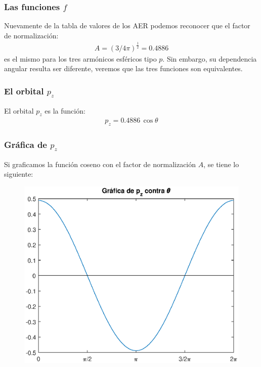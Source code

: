 \documentclass[12pt]{beamer}
\begin{document}

\begin{frame}
\frametitle{Las funciones $f$}
Nuevamente de la tabla de valores de los AER podemos reconocer que el factor de normalización:
\pause
\begin{align*}
A = (3/4 \pi)^{\frac{1}{2}} = 0.4886
\end{align*}
es el mismo para los tres armónicos esféricos tipo $p$. \pause Sin embargo, su dependencia angular resulta ser diferente, veremos que las tres funciones son equivalentes.
\end{frame}
\begin{frame}
\frametitle{El orbital $p_{z}$}
El orbital $p_{z}$ es la función:
\pause
\begin{align*}
p_{z} = 0.4886 \, \cos \theta
\end{align*}
\end{frame}
\begin{frame}
\frametitle{Gráfica de $p_{z}$}
Si graficamos la función coseno con el factor de normalización $A$, se tiene lo siguiente:
\pause
\begin{figure}[H]
    \centering
    \includegraphics[scale=0.5]{Imagenes/Plot_AER_pz_theta.eps}
\end{figure}
\end{frame}
\end{document}
